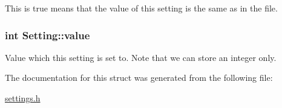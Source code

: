 This is true means that the value of this setting is the same as in the file. 

\hypertarget{structSetting_a047cbc28fb542450105ad9fbfe746167}{}
\subsubsection[{value}]{\setlength{\rightskip}{0pt plus 5cm}int Setting\+::value}\label{structSetting_a047cbc28fb542450105ad9fbfe746167}


Value which this setting is set to. Note that we can store an integer only. 



The documentation for this struct was generated from the following file\+:\begin{DoxyCompactItemize}
\item 
\hyperlink{settings_8h}{settings.\+h}\end{DoxyCompactItemize}
